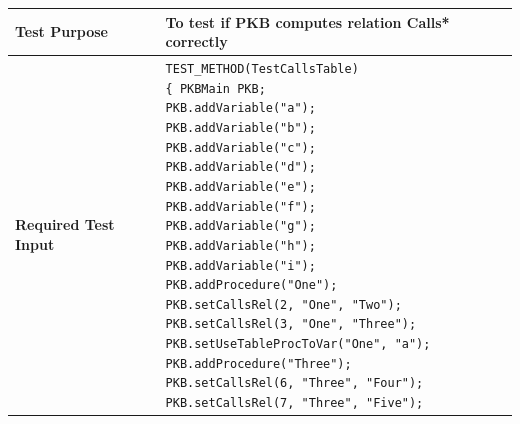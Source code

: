 \documentclass[12pt]{article}
\begin{document}
{{{{{{{{{{{{{\newpage
\begin{longtable}{|L{5cm} | L{12cm}| }
\hline
\textbf{Test Purpose} & To test if PKB computes relation Calls* correctly\\\hline
\textbf{Required Test Input}
 & \texttt{\noindent TEST\_METHOD(TestCallsTable)
\newline
 \{ \hspace{4mm} PKBMain PKB; \newline \vspace{2mm}
 \hspace{9mm} PKB.addVariable("a"); \newline 
    \hspace{9mm} PKB.addVariable("b"); \newline 
	\hspace{9mm} PKB.addVariable("c"); \newline
	\hspace{9mm} PKB.addVariable("d"); \newline
	\hspace{9mm} PKB.addVariable("e"); \newline
	\hspace{9mm} PKB.addVariable("f"); \newline
	\hspace{9mm} PKB.addVariable("g"); \newline
	\hspace{9mm} PKB.addVariable("h"); \newline
	\hspace{9mm} PKB.addVariable("i"); \newline
	\hspace{9mm} PKB.addProcedure("One"); \newline
	\hspace{9mm} PKB.setCallsRel(2, "One", "Two"); \newline
	\hspace{9mm} PKB.setCallsRel(3, "One", "Three"); \newline
	\hspace{9mm} PKB.setUseTableProcToVar("One", "a"); \newline
	\hspace{9mm} PKB.addProcedure("Three"); \newline
	\hspace{9mm} PKB.setCallsRel(6, "Three", "Four"); \newline
	\hspace{9mm} PKB.setCallsRel(7, "Three", "Five"); \newline
}
\end{longtable}}}}}}}}}}}}}}
\end{document}
